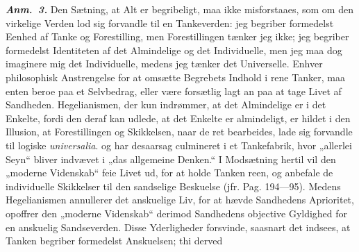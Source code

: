 \documentclass[12pt]{book}
\newcommand{\anm}[1]{\emph{\textbf{Anm.~#1.}}}
\newcommand{\opage}[1]{\marginnote{\footnotesize\textit{[#1]}}}
\begin{document}
\anm{3} Den Sætning, at Alt er begribeligt, maa ikke misforstaaes, som om den
virkelige Verden lod sig forvandle til en Tankeverden: jeg begriber formedelst Eenhed
af Tanke og Forestilling, men Forestillingen tænker jeg ikke; jeg begriber formedelst
Identiteten af det Almindelige og det Individuelle, men jeg maa dog imaginere mig det
Individuelle, medens jeg tænker det Universelle. Enhver philosophisk Anstrengelse for
at omsætte Begrebets Indhold i rene Tanker, maa enten beroe paa et Selvbedrag, eller
\opage{251} %
være forsætlig lagt an paa at tage Livet af Sandheden. Hegelianismen, der kun
indrømmer, at det Almindelige er i det Enkelte, fordi den deraf kan udlede, at det
Enkelte er almindeligt, er hildet i den Illusion, at Forestillingen og Skikkelsen,
naar de ret bearbeides, lade sig forvandle til logiske \textit{universalia}. og har
desaarsag culmineret i et Tankefabrik, hvor „allerlei Seyn“ bliver indvævet i
„das allgemeine Denken.“ I Modsætning hertil vil den „moderne Videnskab“ feie Livet
ud, for at holde Tanken reen, og anbefale de individuelle Skikkelser til den sandselige
Beskuelse (jfr. Pag. 194---95). Medens Hegelianismen annullerer det anskuelige Liv,
for at hævde Sandhedens Aprioritet, opoffrer den „moderne Videnskab“ derimod
Sandhedens objective Gyldighed for en anskuelig Sandseverden. Disse Yderligheder
forsvinde, saasnart det indsees, at Tanken begriber formedelst Anskuelsen; thi derved
\end{document}
